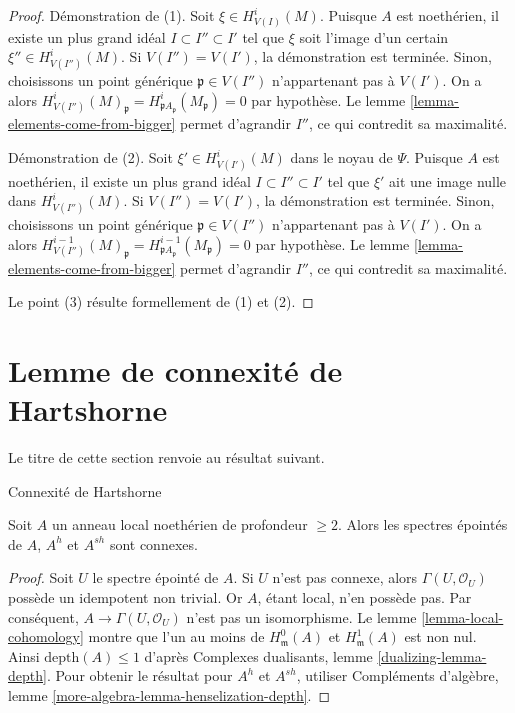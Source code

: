 \begin{proof}
Démonstration de (1). Soit $\xi \in H^i_{V(I)}(M)$. Puisque $A$ est noethérien, il existe un plus grand idéal $I \subset I'' \subset I'$ tel que $\xi$ soit l'image d'un certain $\xi'' \in H^i_{V(I'')}(M)$. Si $V(I'') = V(I')$, la démonstration est terminée. Sinon, choisissons un point générique $\mathfrak p \in V(I'')$ n'appartenant pas à $V(I')$. On a alors $H^i_{V(I'')}(M)_\mathfrak p =
H^i_{\mathfrak pA_\mathfrak p}(M_\mathfrak p) = 0$ par hypothèse. Le lemme \ref{lemma-elements-come-from-bigger} permet d'agrandir $I''$, ce qui contredit sa maximalité.

\medskip\noindent
Démonstration de (2). Soit $\xi' \in H^i_{V(I')}(M)$ dans le noyau de $\Psi$. Puisque $A$ est noethérien, il existe un plus grand idéal $I \subset I'' \subset I'$ tel que $\xi'$ ait une image nulle dans $H^i_{V(I'')}(M)$. Si $V(I'') = V(I')$, la démonstration est terminée. Sinon, choisissons un point générique $\mathfrak p  \in V(I'')$ n'appartenant pas à $V(I')$. On a alors $H^{i - 1}_{V(I'')}(M)_\mathfrak p =
H^{i - 1}_{\mathfrak pA_\mathfrak p}(M_\mathfrak p) = 0$ par hypothèse. Le lemme \ref{lemma-elements-come-from-bigger} permet d'agrandir $I''$, ce qui contredit sa maximalité.

\medskip\noindent
Le point (3) résulte formellement de (1) et (2).
\end{proof}





\section{Lemme de connexité de Hartshorne}
\label{section-hartshorne-connectedness}

\noindent
Le titre de cette section renvoie au résultat suivant.

\begin{lemma}
\label{lemma-depth-2-connected-punctured-spectrum}
\begin{reference}
\cite[Proposition 2.1]{Hartshorne-connectedness}
\end{reference}
\begin{slogan}
Connexité de Hartshorne
\end{slogan}
Soit $A$ un anneau local noethérien de profondeur $\geq 2$. Alors les spectres épointés de $A$, $A^h$ et $A^{sh}$ sont connexes.
\end{lemma}

\begin{proof}
Soit $U$ le spectre épointé de $A$. Si $U$ n'est pas connexe, alors $\Gamma(U, \mathcal{O}_U)$ possède un idempotent non trivial. Or $A$, étant local, n'en possède pas. Par conséquent, $A \to \Gamma(U, \mathcal{O}_U)$ n'est pas un isomorphisme. Le lemme \ref{lemma-local-cohomology} montre que l'un au moins de $H^0_\mathfrak m(A)$ et $H^1_\mathfrak m(A)$ est non nul. Ainsi $\text{depth}(A) \leq 1$ d'après Complexes dualisants, lemme \ref{dualizing-lemma-depth}. Pour obtenir le résultat pour $A^h$ et $A^{sh}$, utiliser Compléments d'algèbre, lemme \ref{more-algebra-lemma-henselization-depth}.
\end{proof}

